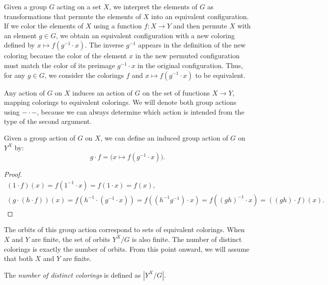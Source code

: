 Given a group $G$ acting on a set $X$, we interpret the elements of $G$ as transformations that permute the elements of $X$ into an equivalent configuration. If we color the elements of $X$ using a function $f : X \to Y$ and then permute $X$ with an element $g \in G$, we obtain an equivalent configuration with a new coloring defined by $x \mapsto f(g^{-1} \cdot x)$. The inverse $g^{-1}$ appears in the definition of the new coloring because the color of the element $x$ in the new permuted configuration must match the color of its preimage $g^{-1} \cdot x$ in the original configuration. Thus, for any $g \in G$, we consider the colorings $f$ and $x \mapsto f(g^{-1} \cdot x)$ to be equivalent.

Any action of $G$ on $X$ induces an action of $G$ on the set of functions $X \to Y$, mapping colorings to equivalent colorings. We will denote both group actions using ${-} \cdot {-}$, because we can always determine which action is intended from the type of the second argument.

\begin{proposition}
  \label{prop:MulActionColorings}
  \leanok
  Given a group action of $G$ on $X$, we can define an induced group action of $G$ on $Y^X$ by:
  \begin{equation*}
    g \cdot f = \big(x \mapsto f(g^{-1} \cdot x)\big).
  \end{equation*}
\end{proposition}

\begin{proof}
  \leanok
  \begin{gather*}
    (1 \cdot f)(x) = f(1^{-1} \cdot x) = f(1 \cdot x) = f(x), \\
    (g \cdot (h \cdot f))(x) = f(h^{-1} \cdot (g^{-1} \cdot x)) = f((h^{-1}g^{-1}) \cdot x) = f((gh)^{-1} \cdot x) = ((gh) \cdot f)(x).
  \end{gather*}
\end{proof}

The orbits of this group action correspond to sets of equivalent colorings. When $X$ and $Y$ are finite, the set of orbits $Y^X/G$ is also finite. The number of distinct colorings is exactly the number of orbits. From this point onward, we will assume that both $X$ and $Y$ are finite.

\begin{definition}
  \label{def:numDistinctColorings}
  \leanok
  The \emph{number of distinct colorings} is defined as $|Y^X/G|$.
\end{definition}

